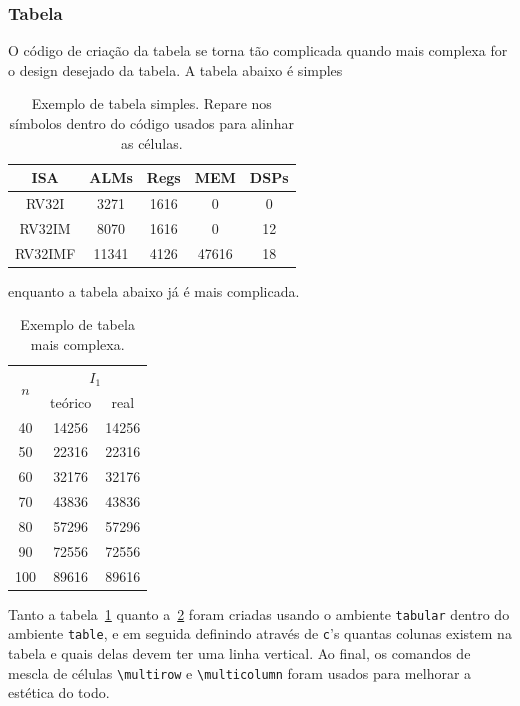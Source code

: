\documentclass[9pt, twocolumn]{extarticle}
\begin{document}
			\subsubsection{Tabela}
				O código de criação da tabela se torna tão complicada quando mais complexa for o design desejado da tabela. 
				A tabela abaixo é simples
				\begin{table}[H]\centering
					\begin{tabular}{c|cccc}
						\toprule
						ISA & ALMs & Regs & MEM & DSPs \\
						\midrule
						\midrule
						RV32I   &  3271 & 1616 &     0 & 0  \\
						RV32IM  &  8070 & 1616 &     0 & 12 \\
						RV32IMF & 11341 & 4126 & 47616 & 18 \\
						\bottomrule
					\end{tabular}
					\caption{%
						Exemplo de tabela simples. 
						Repare nos símbolos dentro do código usados para alinhar as células.
					}
					\label{tab:simples}
				\end{table}
				enquanto a tabela abaixo já é mais complicada.
				\begin{table}[H]\centering
					\def\arraystretch{1.2} %
					\begin{tabular}{c|cc}
						\toprule
						\multirow{2}{*}{$n$} & 
						\multicolumn{2}{c}{$I_1$} \\
						\cline{2-3}
						& teórico & real \\ 
						\hline\hline
						40 & 14256 & 14256 \\
						50 & 22316 & 22316 \\
						60 & 32176 & 32176 \\
						70 & 43836 & 43836 \\
						80 & 57296 & 57296 \\
						90 & 72556 & 72556 \\
						100 & 89616 & 89616 \\
						\bottomrule
					\end{tabular}
					\caption{Exemplo de tabela mais complexa.}
					\label{tab:complexa}
				\end{table}
				Tanto a tabela~\ref{tab:simples} quanto a~\ref{tab:complexa} foram criadas usando o ambiente {\tt tabular} dentro do ambiente {\tt table}, e em seguida definindo através de \verb|c|'s quantas colunas existem na tabela e quais delas devem ter uma linha vertical.
				Ao final, os comandos de mescla de células 
				\verb|\multirow| e \verb|\multicolumn|
				foram usados para melhorar a estética do todo.
			
\end{document}
